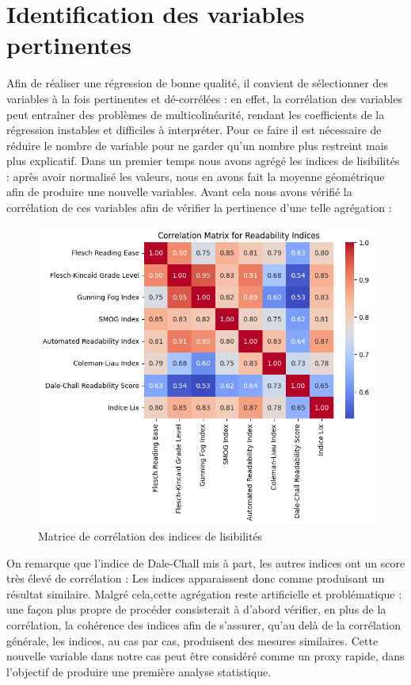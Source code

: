 \documentclass[12pt,a4paper,oneside,titlepage]{book} %
\begin{document}
\section{Identification des variables pertinentes}
Afin de réaliser une régression de bonne qualité, il convient de sélectionner des variables à la fois pertinentes et dé-corrélées : en effet, la corrélation des variables peut entraîner des problèmes de multicolinéarité, rendant les coefficients de la régression instables et difficiles à interpréter. Pour ce faire il est nécessaire de réduire le nombre de variable pour ne garder qu'un nombre plus restreint mais plus explicatif. 
Dans un premier temps nous avons agrégé les indices de lisibilités : après avoir normalisé les valeurs, nous en avons fait la moyenne géométrique afin de produire une nouvelle variables. Avant cela nous avons vérifié la corrélation de ces variables afin de vérifier la pertinence d'une telle agrégation : 
\begin{figure}[htbp]
	\centering
\includegraphics[width=\textwidth]{illustration/corr_read.png}
\caption{Matrice de corrélation des indices de lisibilités}
\label{fig_corrread}
\end{figure}

On remarque que l'indice de Dale-Chall mis à part, les autres indices ont un score très élevé de corrélation : Les indices apparaissent donc comme produisant un résultat similaire. 
Malgré cela,cette agrégation reste artificielle et problématique : une façon plus \og propre\fg{} de procéder consisterait à d'abord vérifier, en plus de la corrélation, la cohérence des indices afin de s'assurer, qu'au delà de la corrélation générale, les indices, au cas par cas, produisent des mesures similaires. Cette nouvelle variable dans notre cas peut être considéré comme un \og proxy \fg{} rapide, dans l'objectif de produire une première analyse statistique.
\end{document}
